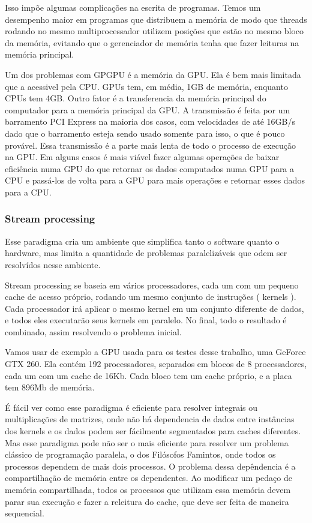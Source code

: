 Isso impõe algumas complicações na escrita de programas. Temos um desempenho
maior em programas que distribuem a memória de modo que threads rodando no mesmo multiprocessador utilizem posições
que estão no mesmo bloco da memória, evitando que o gerenciador de memória tenha que fazer leituras na memória principal.

Um dos problemas com GPGPU é a memória da GPU. Ela é bem mais limitada que a acessivel pela CPU. GPUs tem, em média, 1GB
de memória, enquanto CPUs tem 4GB. Outro fator é a transferencia da memória principal do computador para a memória principal
da GPU. A transmissão é feita por um barramento PCI Express na maioria dos casos, com velocidades de até 16GB/s dado que o
barramento esteja sendo usado somente para isso, o que é pouco provável. Essa transmissão é a parte mais lenta de todo o
processo de execução na GPU. Em alguns casos é mais viável fazer algumas operações de baixar eficiência numa GPU do que
retornar os dados computados numa GPU para a CPU e passá-los de volta para a GPU para mais operações e retornar esses
dados para a CPU.

\subsubsection{Stream processing}
Esse paradigma cria um ambiente que simplifica tanto o software quanto o hardware, mas limita a quantidade de problemas 
paralelizáveis que odem ser resolvídos nesse ambiente.

Stream processing se baseia em vários processadores, cada um com um pequeno cache de acesso próprio, 
rodando um mesmo conjunto de instruções ( kernels ). Cada processador irá aplicar o mesmo kernel em um
conjunto diferente de dados, e todos eles executarão seus kernels em paralelo. No final, todo o resultado é
combinado, assim resolvendo o problema inicial.

Vamos usar de exemplo a GPU usada para os testes desse trabalho, uma GeForce GTX 260. Ela contém
192 processadores, separados em blocos de 8 processadores, cada um com um cache de 16Kb. Cada bloco
tem um cache próprio, e a placa tem 896Mb de memória.

É fácil ver como esse paradigma é eficiente para resolver integrais ou multiplicações de matrizes, onde não há
dependencia de dados entre instâncias dos kernels e os dados podem ser fácilmente segmentados para caches diferentes.
Mas esse paradigma pode não ser o mais eficiente para resolver um problema clássico de programação paralela, o dos
Filósofos Famintos, onde todos os processos dependem de mais dois processos. O problema dessa depêndencia é a 
compartilhação de memória entre os dependentes. Ao modificar um pedaço de memória compartilhada, todos os processos 
que utilizam essa memória devem parar sua execução e fazer a releitura do cache, que deve ser feita de maneira sequencial.

